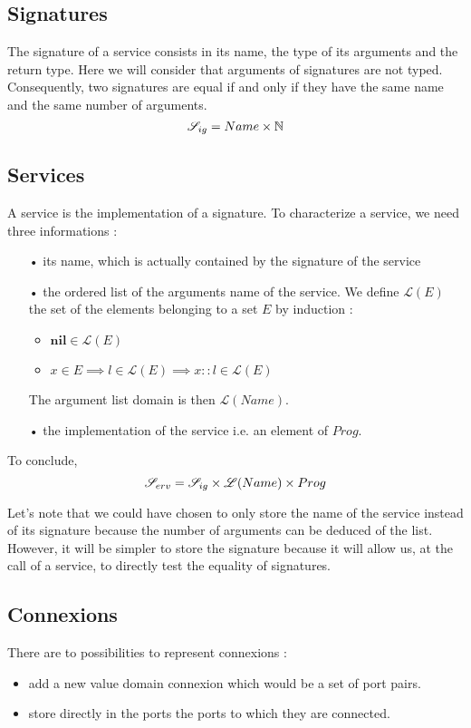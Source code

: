 \subsection{Signatures}
The signature of a service consists in its name, the type of its arguments and the return type.
Here we will consider that arguments of signatures are not typed. Consequently, two signatures are equal if and only if they have the same name and the same number of arguments. 
\[\mathcal{S}_{ig} = Name \times \mathbb{N}\]

\subsection{Services}
A service is the implementation of a signature. To characterize a service, we need three informations : 
\begin{itemize}
\item[•] its \textsf{name}, which is actually contained by the signature of the service
\item[•] the ordered list of the arguments name of the service. We define $\mathcal{L}(E)$
the set of the elements belonging to a set $E$ by induction : 
\begin{itemize}
\item $ \mathbf{nil} \in \mathcal{L}(E)$
\item $ x \in E  \implies l \in \mathcal{L}(E) \implies x::l \in \mathcal{L}(E) $
\end{itemize}
The argument list domain is then $\mathcal{L}(Name)$.
\item[•] the \textsf{implementation} of the service i.e. an element of $Prog$.
\end{itemize}
To conclude, 
\[\mathcal{S}_{erv} = \mathcal{S}_{ig} \times \mathcal{L}(Name)\times Prog\]

Let's note that we could have chosen to only store the name of the service instead of its signature because the number of arguments can be deduced of the list. However, it will be simpler to store the signature because it will allow us, at the call of a service, to directly test the equality of signatures.


\subsection{Connexions} There are to possibilities to represent connexions :
\begin{itemize}
\item add a new value domain \textsf{connexion} which would be a set of port pairs. 
\item store directly in the ports the ports to which they are connected.
\end{itemize}


